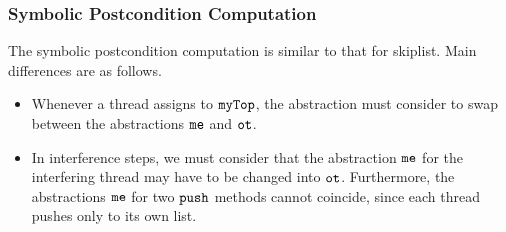 



\subsubsection{Symbolic Postcondition Computation}
The symbolic postcondition computation is similar to that for skiplist.
Main differences are as follows.
\begin{itemize}
\item
  Whenever a thread assigns to $\tt myTop$, the abstraction must consider
  to swap between the abstractions $\tt me$ and $\tt ot$.
  \item
    In interference steps, we must consider that the abstraction
    $\tt me$ for the interfering thread may have to be changed into $\tt ot$.
    Furthermore, the abstractions $\tt me$ for two $\tt push$ methods
    cannot coincide, since each thread pushes only to its own list.
\end{itemize}

